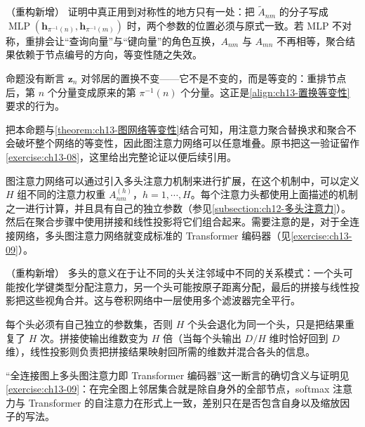 \documentclass[../../main.tex]{subfiles}
\begin{document}
\begin{remark}（重构新增）
证明中真正用到对称性的地方只有一处：把 $\widetilde{A}_{nm}$ 的分子写成 $\operatorname{MLP}(\bm{h}_{\pi^{-1}(n)},\bm{h}_{\pi^{-1}(m)})$ 时，两个参数的位置必须与原式一致。若 MLP 不对称，重排会让“查询向量”与“键向量”的角色互换，$A_{nm}$ 与 $A_{mn}$ 不再相等，聚合结果依赖于节点编号的方向，等变性随之失效。\par
命题没有断言 $\bm{z}_n$ 对邻居的置换不变——它不是不变的，而是等变的：重排节点后，第 $n$ 个分量变成原来的第 $\pi^{-1}(n)$ 个分量。这正是\eqref{align:ch13-置换等变性}要求的行为。\par
把本命题与\cref{theorem:ch13-图网络等变性}结合可知，用注意力聚合替换求和聚合不会破坏整个网络的等变性，因此图注意力网络可以任意堆叠。原书把这一验证留作\cref{exercise:ch13-08}，这里给出完整论证以便后续引用。
\end{remark}

\begin{definition}[多头图注意力]\label{definition:ch13-多头图注意力}
图注意力网络可以通过引入多头注意力机制来进行扩展，在这个机制中，可以定义 $H$ 组不同的注意力权重 $A_{nm}^{(h)}$，$h=1,\cdots,H$。每个注意力头都使用上面描述的机制之一进行计算，并且具有自己的独立参数（参见\cref{subsection:ch12-多头注意力}）。然后在聚合步骤中使用拼接和线性投影将它们组合起来。需要注意的是，对于全连接网络，多头图注意力网络就变成标准的 Transformer 编码器（见\cref{exercise:ch13-09}）。
\end{definition}

\begin{remark}（重构新增）
多头的意义在于让不同的头关注邻域中不同的关系模式：一个头可能按化学键类型分配注意力，另一个头可能按原子距离分配，最后的拼接与线性投影把这些视角合并。这与卷积网络中一层使用多个滤波器完全平行。\par
每个头必须有自己独立的参数集，否则 $H$ 个头会退化为同一个头，只是把结果重复了 $H$ 次。拼接使输出维数变为 $H$ 倍（当每个头输出 $D/H$ 维时恰好回到 $D$ 维），线性投影则负责把拼接结果映射回所需的维数并混合各头的信息。\par
“全连接图上多头图注意力即 Transformer 编码器”这一断言的确切含义与证明见\cref{exercise:ch13-09}：在完全图上邻居集合就是除自身外的全部节点，softmax 注意力与 Transformer 的自注意力在形式上一致，差别只在是否包含自身以及缩放因子的写法。
\end{remark}
\end{document}
